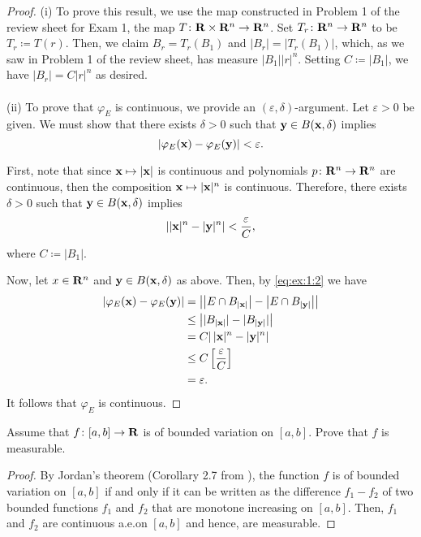 \begin{proof}
(i) To prove this result, we use the map constructed in Problem 1 of the
review sheet for Exam 1, the map $T\colon\mathbf{R}\times\mathbf{R}^n\to\mathbf{R}^n$. Set
$T_r\colon\mathbf{R}^n\to\mathbf{R}^n$ to be $T_r\coloneqq T(r)$. Then, we claim
$B_r=T_r(B_1)$ and $|B_r|=|T_r(B_1)|$, which, as we saw in Problem 1 of the
review sheet, has measure $|B_1||r|^n$. Setting $C\coloneqq |B_1|$, we have
$|B_r|=C|r|^n$ as desired.
\\\\
(ii) To prove that $\varphi_E$ is continuous, we provide an
$(\varepsilon,\delta)$-argument. Let $\varepsilon>0$ be given. We must show
that there exists $\delta>0$ such that $\mathbf{y}\in B(\mathbf{x},\delta)$ implies
\begin{equation}
\label{eq:ex:1:1}
\left|\varphi_E(\mathbf{x})-\varphi_E(\mathbf{y})\right|<\varepsilon.
\end{equation}

First, note that since $\mathbf{x}\mapsto |\mathbf{x}|$ is continuous and polynomials
$p\colon\mathbf{R}^n\to\mathbf{R}^n$ are continuous, then the composition
$\mathbf{x}\mapsto|\mathbf{x}|^n$ is continuous. Therefore, there exists $\delta>0$
such that $\mathbf{y}\in B(\mathbf{x},\delta)$ implies
\begin{equation}
\label{eq:ex:1:2}
\left||\mathbf{x}|^n-|\mathbf{y}|^n\right|<\frac{\varepsilon}{C},
\end{equation}
where $C\coloneqq |B_1|$.

Now, let $x\in\mathbf{R}^n$ and $\mathbf{y}\in B(\mathbf{x},\delta)$ as above. Then, by
\eqref{eq:ex:1:2} we have
\begin{equation}
\label{eq:ex:1:3}
\begin{aligned}
\left|\varphi_E(\mathbf{x})-\varphi_E(\mathbf{y})\right|
&=\left|
\left|E\cap B_{|\mathbf{x}|}\right|
-
\left|E\cap B_{|\mathbf{y}|}\right|
\right|\\
&\leq\left| |B_{|\mathbf{x}|}|-|B_{|\mathbf{y}|}|\right|\\
&=C|\left|\mathbf{x}|^n-|\mathbf{y}|^n\right|\\
&\leq C\left[\frac{\varepsilon}{C}\right]\\
&=\varepsilon.
\end{aligned}
\end{equation}
It follows that $\varphi_E$ is continuous.
\end{proof}

\begin{problem}
Assume that $f\colon[a,b]\to\mathbf{R}$ is of bounded variation on $[a,b]$. Prove
that $f$ is measurable.
\end{problem}
\begin{proof}
By Jordan's theorem (Corollary 2.7 from \cite[Ch.\@ 2, p.\@
21]{wheeden-zygmund}), the function $f$ is of bounded variation on $[a,b]$
if and only if it can be written as the difference $f_1-f_2$ of two bounded
functions $f_1$ and $f_2$ that are monotone increasing on $[a,b]$. Then,
$f_1$ and $f_2$ are continuous a.e.\@ on $[a,b]$ and hence, are
measurable.
\end{proof}

